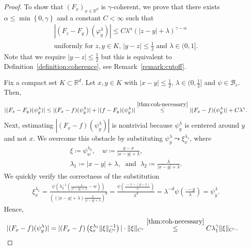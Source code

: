 \begin{proof}
   To show that \({(F_x)}_{x \in \mathbb{R}^d}\) is \(\gamma\)-coherent, we prove that there exists \(\alpha \leq \min\left\{ 0, \gamma \right\}\) and a constant \(C < \infty\) such that
   \begin{gather*}
        |(F_z - F_y)(\varphi^\lambda_y)| \leq C\lambda^\alpha{(|z-y| + \lambda)}^{\gamma - \alpha}  \\ \text{uniformly for \(z,y \in K\), \(|y-z| \leq \frac{1}{2}\)  and \(\lambda \in (0,1]\)} \nonumber. %
   \end{gather*}  
   Note that we require \(|y-z| \leq \frac{1}{2}\) but this is equivalent to Definition~\ref{definition:coherence}, see Remark~\ref{remark:cutoff}.

   Fix a compact set \(K \subset \mathbb{R}^d\). Let \(x,y \in K\) with \(|x-y| \leq \frac{1}{2}\), \(\lambda \in (0, \frac{1}{2}]\) and \(\psi \in \mathcal{B}_r\). Then,
   \begin{align*}
    |(F_x - F_y)(\psi^\lambda_y)| \leq |(F_x - f)(\psi^\lambda_y)| + |(f - F_y)(\psi^\lambda_y)| \overset{\eqref{thm:coh-necessary}}{\leq} |(F_x - f)(\psi^\lambda_y)| + C \lambda^\gamma.
   \end{align*}
   Next, estimating \(|(F_x - f)(\psi^\lambda_y)|\) is nontrivial because \(\psi_y^\lambda\) is centered around \(y\) and not \(x\). We overcome this obstacle by substituting \(\psi^\lambda_y \leadsto \xi^{\lambda_1}_x\), where 
   \begin{gather*}
       \xi \coloneqq \psi^{\lambda_2}_w, \quad w \coloneqq \frac{y-x}{|x-y| + \lambda}, \\
    \lambda_1 \coloneqq |x-y| + \lambda, \;\text{ and } \; \lambda_2 \coloneqq \frac{\lambda}{|x-y|  + \lambda}.
   \end{gather*}
   We quickly verify the correctness of the substitution
   \begin{align*}
    \xi^{\lambda_1}_x = \frac{\psi\left(
        \lambda_2^{-1}\left(\frac{\cdot - x}{|x-y| + \lambda} - w\right)
    \right) }{\left((|x-y| + \lambda)\frac{\lambda}{|x-y| + \lambda}\right)^d}
    =
    \frac{\psi\left(
        \frac{\cdot - x - (y-x)}{\lambda}
    \right) }{\lambda^d} = \lambda^{-d}\psi\left( \frac{\cdot - y}{\lambda} \right) = \psi^\lambda_{y}.
   \end{align*}
   Hence, 
   \begin{align}
    |(F_x - f)(\psi^\lambda_y)| = |(F_x - f)\left( \xi^{\lambda_1}_x \lVert \xi \rVert_{C^{r}}^{-1} \right)| \cdot  \lVert \xi \rVert_{C^{r}} &\overset{\eqref{thm:coh-necessary}}{\leq} C\lambda_1^\gamma\lVert \xi \rVert_{C^{r}}. \label{SponsoredByGilette}

\end{align}
\end{proof}
